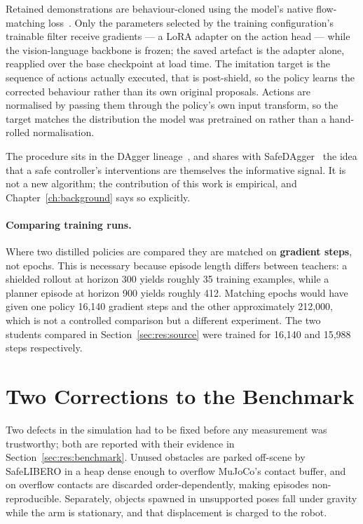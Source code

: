 \documentclass[a4paper,11pt]{report}
\begin{document}
Retained demonstrations are behaviour-cloned using the model's native flow-matching
loss~\cite{physicalintelligence2025pi05,black2024pi0}. Only the parameters selected by the training
configuration's trainable filter receive gradients --- a LoRA adapter on the action head --- while
the vision-language backbone is frozen; the saved artefact is the adapter alone, reapplied over the
base checkpoint at load time. The imitation target is the sequence of actions actually executed,
that is post-shield, so the policy learns the corrected behaviour rather than its own original
proposals. Actions are normalised by passing them through the policy's own input transform, so the
target matches the distribution the model was pretrained on rather than a hand-rolled
normalisation.

The procedure sits in the DAgger lineage~\cite{ross2011dagger}, and shares with
SafeDAgger~\cite{zhang2017safedagger} the idea that a safe controller's interventions are
themselves the informative signal. It is not a new algorithm; the contribution of this work is
empirical, and Chapter~\ref{ch:background} says so explicitly.

\paragraph{Comparing training runs.}
Where two distilled policies are compared they are matched on \textbf{gradient steps}, not epochs.
This is necessary because episode length differs between teachers: a shielded rollout at horizon
300 yields roughly 35 training examples, while a planner episode at horizon 900 yields roughly 412.
Matching epochs would have given one policy 16{,}140 gradient steps and the other approximately
212{,}000, which is not a controlled comparison but a different experiment. The two students
compared in Section~\ref{sec:res:source} were trained for 16{,}140 and 15{,}988 steps respectively.

\section{Two Corrections to the Benchmark}\label{sec:benchmark_fixes}

Two defects in the simulation had to be fixed before any measurement was trustworthy; both are
reported with their evidence in Section~\ref{sec:res:benchmark}. Unused obstacles are parked
off-scene by SafeLIBERO in a heap dense enough to overflow MuJoCo's contact buffer, and on overflow
contacts are discarded order-dependently, making episodes non-reproducible. Separately, objects
spawned in unsupported poses fall under gravity while the arm is stationary, and that displacement
is charged to the robot.
\end{document}

